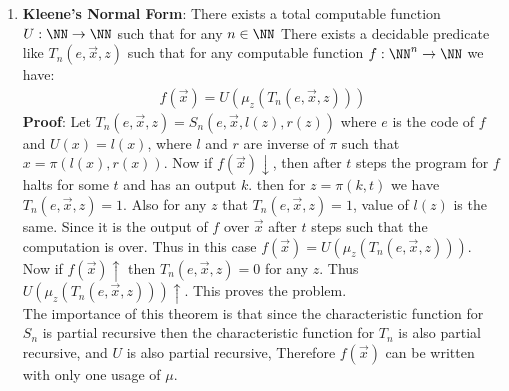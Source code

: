 \begin{enumerate}[label=]
    \item 
        \textbf{Kleene's Normal Form}: There exists a total computable function $U: \NN \to \NN$ such that for any $n \in \NN$ There exists a decidable predicate like $T_n(e, \overset{\to }{x}, z)$ such that for any computable function $f: \NN^n \to \NN$ we have:
        \begin{gather*}
            f(\overset{\to}{x}) = U(\mu_z(T_n(e, \overset{\to}{x}, z)))
        \end{gather*}
        \textbf{Proof}: Let $T_n(e, \overset{\to}{x}, z) = S_n(e, \overset{\to}{x}, l(z), r(z))$ where $e$ is the code of $f$ and $U(x) = l(x)$, where $l$ and $r$ are inverse of $\pi$ such that $x = \pi(l(x), r(x))$. Now if $f(\overset{\to}{x}) \downarrow$, then after $t$ steps the program for $f$ halts for some $t$ and has an output $k$. then for $z = \pi(k, t)$ we have $T_n(e, \overset{\to}{x}, z) = 1$. Also for any $z$ that $T_n(e, \overset{\to}{x}, z) = 1$, value of $l(z)$ is the same. Since it is the output of $f$ over $\overset{\to}{x}$ after $t$ steps such that the computation is over.
        Thus in this case $f(\overset{\to}{x}) = U(\mu_z(T_n(e, \overset{\to}{x}, z)))$. 
        Now if $f(\overset{\to}{x}) \uparrow$ then $T_n(e, \overset{\to}{x}, z) = 0$ for any $z$. Thus $U(\mu_z(T_n(e, \overset{\to}{x}, z))) \uparrow$. This proves the problem. \\
        The importance of this theorem is that since the characteristic function for $S_n$ is partial recursive then the characteristic function for $T_n$ is also partial recursive, and $U$ is also partial recursive, Therefore $f(\overset{\to}{x})$ can be written with only one usage of $\mu$.
\end{enumerate}